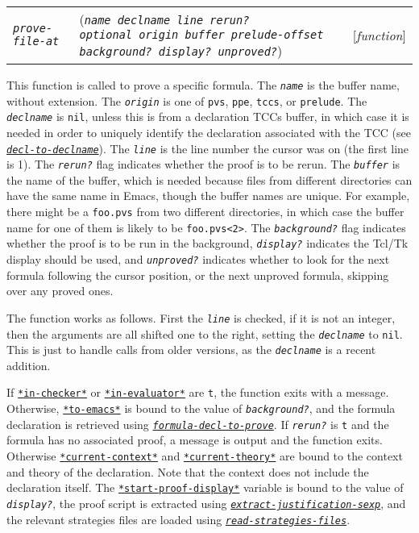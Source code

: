 \documentclass[12pt]{book}
\makeatletter
\def\ampoptional{{\smaller\sc {\smaller\smaller \&}optional\ }}
\newenvironment{function}[3]%
{\par\noindent\begin{boxedminipage}{\textwidth}%
 \par\noindent\begin{tabularx}{\linewidth}{l>{\raggedright}Xr}%
 \functionhtgt{#1}&(\texttt{\textit{#2}})&[\emph{#3}]%
 \end{tabularx}\par\flushright\begin{minipage}{.97\textwidth}}
{\end{minipage}\end{boxedminipage}}
\newcommand{\functionarg}[1]{\texttt{\textit{#1}}}
\newcommand{\functionnm}[1]{\texttt{\textit{#1}}}
\newcommand{\functionhln}[1]{\hyperlink{#1}{\functionnm{#1}}}
\newcommand{\functionhtgt}[1]{\hypertarget{#1}{\functionnm{#1}}\index{#1@\functionnm{#1}|underline}}
\newenvironment{lispfunction}[2]%
{\begin{function}{#1}{#2}{function}}{\end{function}}
\newcommand{\globalnm}[1]{\texttt{\textup{#1}}}
\newcommand{\globalhln}[1]{\hyperlink{#1}{\globalnm{#1}}}
\makeatother
\begin{document}
\begin{lispfunction}{prove-file-at}{name declname line rerun? \ampoptional origin buffer prelude-offset background? display? unproved?}
This function is called to prove a specific formula.  The
\functionarg{name} is the buffer name, without extension.  The
\functionarg{origin} is one of \texttt{pvs}, \texttt{ppe}, \texttt{tccs},
or \texttt{prelude}.  The \functionarg{declname} is \texttt{nil}, unless
this is from a declaration TCCs buffer, in which case it is needed in
order to uniquely identify the declaration associated with the TCC (see
\functionhln{decl-to-declname}).  The \functionarg{line} is the line
number the cursor was on (the first line is 1).  The \functionarg{rerun?}
flag indicates whether the proof is to be rerun.  The \functionarg{buffer}
is the name of the buffer, which is needed because files from different
directories can have the same name in Emacs, though the buffer names are
unique.  For example, there might be a \texttt{foo.pvs} from two different
directories, in which case the buffer name for one of them is likely to be
\texttt{foo.pvs<2>}.  The \functionarg{background?} flag indicates whether
the proof is to be run in the background, \functionarg{display?} indicates
the Tcl/Tk display should be used, and \functionarg{unproved?} indicates
whether to look for the next formula following the cursor position, or the
next unproved formula, skipping over any proved ones.

The function works as follows.  First the \functionarg{line} is checked,
if it is not an integer, then the arguments are all shifted one to the
right, setting the \functionarg{declname} to \texttt{nil}.  This is just
to handle calls from older versions, as the \functionarg{declname} is a
recent addition.

If \globalhln{*in-checker*} or \globalhln{*in-evaluator*} are \texttt{t},
the function exits with a message.  Otherwise, \globalhln{*to-emacs*} is
bound to the value of \functionarg{background?}, and the formula
declaration is retrieved using \functionhln{formula-decl-to-prove}.  If
\functionarg{rerun?} is \texttt{t} and the formula has no associated
proof, a message is output and the function exits.  Otherwise
\globalhln{*current-context*} and \globalhln{*current-theory*} are bound
to the context and theory of the declaration.  Note that the context does
not include the declaration itself.  The \globalhln{*start-proof-display*}
variable is bound to the value of \functionarg{display?}, the proof script
is extracted using \functionhln{extract-justification-sexp}, and the
relevant strategies files are loaded using
\functionhln{read-strategies-files}.


\end{lispfunction}
\end{document}
